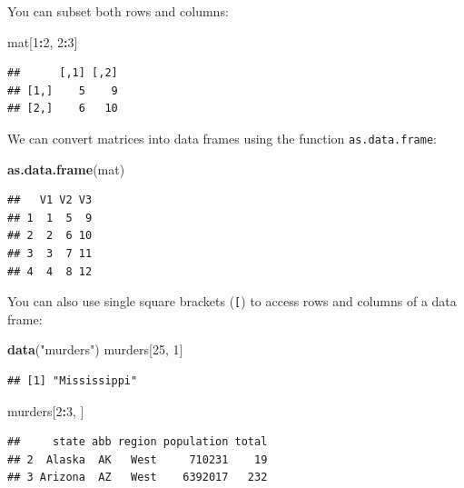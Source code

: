 \documentclass[
]{article}
\newenvironment{Shaded}{\begin{snugshade}}{\end{snugshade}}
\newcommand{\DecValTok}[1]{\textcolor[rgb]{0.00,0.00,0.81}{#1}}
\newcommand{\FunctionTok}[1]{\textcolor[rgb]{0.13,0.29,0.53}{\textbf{#1}}}
\newcommand{\NormalTok}[1]{#1}
\newcommand{\SpecialCharTok}[1]{\textcolor[rgb]{0.81,0.36,0.00}{\textbf{#1}}}
\newcommand{\StringTok}[1]{\textcolor[rgb]{0.31,0.60,0.02}{#1}}
\begin{document}
You can subset both rows and columns:

\begin{Shaded}
\begin{Highlighting}[]
\NormalTok{mat[}\DecValTok{1}\SpecialCharTok{:}\DecValTok{2}\NormalTok{, }\DecValTok{2}\SpecialCharTok{:}\DecValTok{3}\NormalTok{]}
\end{Highlighting}
\end{Shaded}

\begin{verbatim}
##      [,1] [,2]
## [1,]    5    9
## [2,]    6   10
\end{verbatim}

We can convert matrices into data frames using the function
\texttt{as.data.frame}:

\begin{Shaded}
\begin{Highlighting}[]
\FunctionTok{as.data.frame}\NormalTok{(mat)}
\end{Highlighting}
\end{Shaded}

\begin{verbatim}
##   V1 V2 V3
## 1  1  5  9
## 2  2  6 10
## 3  3  7 11
## 4  4  8 12
\end{verbatim}

You can also use single square brackets (\texttt{{[}}) to access rows
and columns of a data frame:

\begin{Shaded}
\begin{Highlighting}[]
\FunctionTok{data}\NormalTok{(}\StringTok{"murders"}\NormalTok{)}
\NormalTok{murders[}\DecValTok{25}\NormalTok{, }\DecValTok{1}\NormalTok{]}
\end{Highlighting}
\end{Shaded}

\begin{verbatim}
## [1] "Mississippi"
\end{verbatim}

\begin{Shaded}
\begin{Highlighting}[]
\NormalTok{murders[}\DecValTok{2}\SpecialCharTok{:}\DecValTok{3}\NormalTok{, ]}
\end{Highlighting}
\end{Shaded}

\begin{verbatim}
##     state abb region population total
## 2  Alaska  AK   West     710231    19
## 3 Arizona  AZ   West    6392017   232
\end{verbatim}
\end{document}
